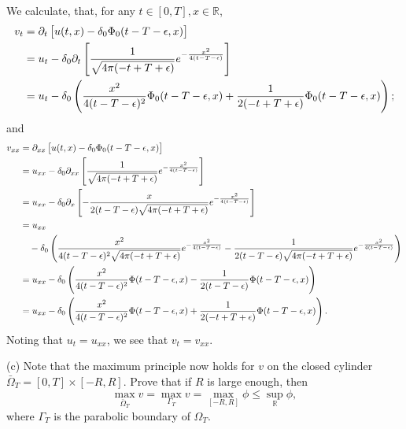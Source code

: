 \documentclass{article}
\begin{document}
We calculate, that, for any $t \in [0, T], x \in \mathbb{R}$,
%
\begin{align*}
    v_t &= \partial_t \sbr{u(t, x) - \delta_0 \Phi_0(t - T - \epsilon, x)} \\
        &= u_t - \delta_0 \partial_t
            \sbr{
                \frac{1}{\sqrt{4 \pi (- t + T + \epsilon)}}
                e^{- \frac{x^2}{4 (t - T - \epsilon)}}
            } \\
        &= u_t - \delta_0
            \del{
                \frac{x^2}{4 (t - T - \epsilon)^2} \Phi_0(t - T - \epsilon, x)
                + \frac{1}{2 (-t + T + \epsilon)} \Phi_0(t - T - \epsilon, x)
            }
        ;
\end{align*}
%
and
%
\begin{align*}
    v_{xx} &= \partial_{xx} \sbr{u(t, x) - \delta_0 \Phi_0(t - T - \epsilon, x)} \\
           &= u_{xx} - \delta_0 \partial_{xx}
            \sbr{
                \frac{1}{\sqrt{4 \pi (-t + T + \epsilon)}}
                e^{- \frac{x^2}{4 (t - T - \epsilon)}}
            } \\
           &= u_{xx} - \delta_0 \partial_x
            \sbr{
                - \frac{x}{2 (t - T - \epsilon) \sqrt{4 \pi (-t + T + \epsilon)}}
                e^{- \frac{x^2}{4 (t - T - \epsilon)}}
            } \\
           &= u_{xx} \\
           &\quad - \delta_0
            \del{
                \frac{x^2}{4 (t - T - \epsilon)^2 \sqrt{4 \pi (-t + T + \epsilon)}}
                e^{- \frac{x^2}{4 (t - T - \epsilon)}}
                - \frac{1}{2 (t - T - \epsilon) \sqrt{4 \pi (-t + T + \epsilon)}}
                e^{- \frac{x^2}{4 (t - T - \epsilon)}}
            } \\
           &= u_{xx} - \delta_0
            \del{
                \frac{x^2}{4 (t - T - \epsilon)^2} \Phi(t - T - \epsilon, x)
                - \frac{1}{2 (t - T - \epsilon)} \Phi(t - T - \epsilon, x)
            } \\
           &= u_{xx} - \delta_0
            \del{
                \frac{x^2}{4 (t - T - \epsilon)^2} \Phi(t - T - \epsilon, x)
                + \frac{1}{2 (-t + T + \epsilon)} \Phi(t - T - \epsilon, x)
            }
        .
\end{align*}
%
Noting that $u_t = u_{xx}$, we see that $v_t = v_{xx}$.

\vspace{5mm}

(c) Note that the maximum principle now holds for $v$ on the closed
cylinder $\bar{\Omega}_T = [0, T] \times [-R, R]$. Prove that if $R$ is
large enough, then
%
\begin{equation*}
    \max_{\bar{\Omega}_T} v = \max_{\Gamma_T} v = \max_{[-R, R]} \phi \leq \sup_\mathbb{R} \phi
    ,
\end{equation*}
%
where $\Gamma_T$ is the parabolic boundary of $\Omega_T$.
\end{document}
